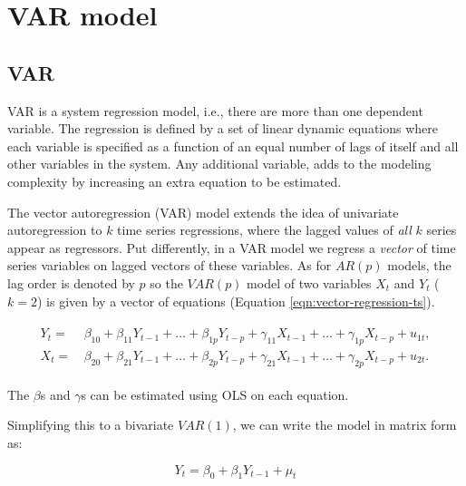 \documentclass[
  12pt,
]{article}
\begin{document}
\hypertarget{var-model}{%
\section{VAR model}\label{var-model}}

\hypertarget{var}{%
\subsection{VAR}\label{var}}

VAR is a system regression model, i.e., there are more than one dependent variable. The regression is defined by a set of linear dynamic equations where each variable is specified as a function of an equal number of lags of itself and all other variables in the system. Any additional variable, adds to the modeling complexity by increasing an extra equation to be estimated.

The vector autoregression (VAR) model extends the idea of univariate autoregression to \(k\) time series regressions, where the lagged values of \emph{all} \(k\) series appear as regressors. Put differently, in a VAR model we regress a \emph{vector} of time series variables on lagged vectors of these variables. As for \(AR(p)\) models, the lag order is denoted by \(p\) so the \(VAR(p)\) model of two variables \(X_t\) and \(Y_t\) (\(k=2\)) is given by a vector of equations (Equation \ref{eqn:vector-regression-ts}).

\begin{equation}
\label{eqn:vector-regression-ts}
\begin{split}
\begin{aligned}
  Y_t =& \, \beta_{10} + \beta_{11} Y_{t-1} + \dots + \beta_{1p} Y_{t-p} + \gamma_{11} X_{t-1} + \dots + \gamma_{1p} X_{t-p} + u_{1t}, \\
  X_t =& \, \beta_{20} + \beta_{21} Y_{t-1} + \dots + \beta_{2p} Y_{t-p} + \gamma_{21} X_{t-1} + \dots + \gamma_{2p} X_{t-p} + u_{2t}.
\end{aligned}
\end{split}
\end{equation}

The \(\beta\)s and \(\gamma\)s can be estimated using OLS on each equation.

Simplifying this to a bivariate \(VAR(1)\), we can write the model in matrix form as:

\begin{equation}
\label{eqn:matix-var1-model}
Y_t = \beta_0 + \beta_1 Y_{t-1} + \mu_t
\end{equation}
\end{document}
